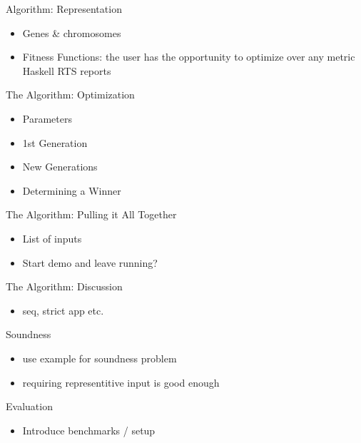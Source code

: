 \documentclass{beamer}
\begin{document}
\begin{frame}{Algorithm: Representation}
  \begin{itemize}
  \item Genes \& chromosomes
  \item Fitness Functions: the user has the opportunity to optimize over any 
                            metric Haskell RTS reports
  \end{itemize}
\end{frame}

\begin{frame}{The Algorithm: Optimization}
  \begin{itemize}
  \item Parameters
  \item 1st Generation
  \item New Generations
  \item Determining a Winner
  \end{itemize}
\end{frame}

\begin{frame}{The Algorithm: Pulling it All Together}
  \begin{itemize}
  \item List of inputs
  \item Start demo and leave running?
  \end{itemize}
\end{frame}

\begin{frame}{The Algorithm: Discussion}
  \begin{itemize}
  \item seq, strict app etc. 
  \end{itemize}
\end{frame}

\begin{frame}{Soundness}
  \begin{itemize}
  \item use example for soundness problem
  \item requiring representitive input is good enough
  \end{itemize}
\end{frame}

\begin{frame}{Evaluation}
  \begin{itemize}
  \item Introduce benchmarks / setup
  \end{itemize}
\end{frame}
\end{document}
